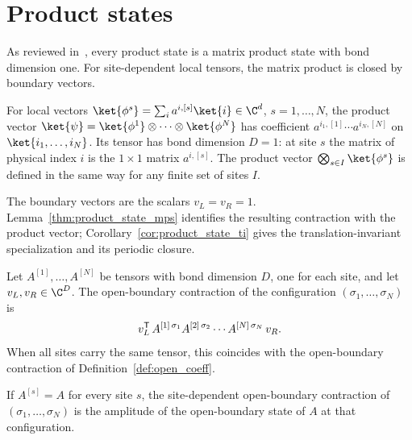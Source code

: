 \section{Product states}\label{sec:product_states}

As reviewed in~\cite[Appendix~A, ``Product states'']{Cirac2021Matrix}, every
product state is a matrix product state with bond dimension one. For
site-dependent local tensors, the matrix product is closed by boundary vectors.

\begin{definition}\label{def:product_state_tensor}
    \leanok
    For local vectors $\ket{\phi^s}=\sum_{i}a^{i,[s]}\ket{i}\in\C^d$,
    $s=1,\ldots,N$, the product vector
    $\ket{\psi}=\ket{\phi^1}\otimes\cdots\otimes\ket{\phi^N}$ has coefficient
    $a^{i_1,[1]}\cdots a^{i_N,[N]}$ on $\ket{i_1,\ldots,i_N}$. Its tensor has
    bond dimension $D=1$: at site $s$ the matrix of physical index $i$ is the
    $1\times1$ matrix $a^{i,[s]}$. The product vector
    $\bigotimes_{s\in I}\ket{\phi^s}$ is defined in the same way for any
    finite set of sites $I$.
\end{definition}

The boundary vectors are the scalars $v_L=v_R=1$.
Lemma~\ref{thm:product_state_mps} identifies the resulting contraction
with the product vector; Corollary~\ref{cor:product_state_ti} gives the
translation-invariant specialization and its periodic closure.

\begin{definition}\label{def:site_open_coeff}
    \leanok
    Let $A^{[1]},\ldots,A^{[N]}$ be tensors with bond dimension $D$, one for
    each site, and let $v_L,v_R\in\C^D$. The open-boundary contraction of the
    configuration $(\sigma_1,\ldots,\sigma_N)$ is
    \begin{align}
        v_L^{\mathsf T}\,A^{[1]\,\sigma_1}A^{[2]\,\sigma_2}\cdots
        A^{[N]\,\sigma_N}\,v_R.
        \notag
    \end{align}
    When all sites carry the same tensor, this coincides with the open-boundary
    contraction of Definition~\ref{def:open_coeff}.
\end{definition}

\begin{lemma}\label{lem:site_open_coeff_const}
    \leanok
    If $A^{[s]}=A$ for every site $s$, the site-dependent open-boundary
    contraction of $(\sigma_1,\ldots,\sigma_N)$ is the amplitude of the
    open-boundary state of $A$ at that configuration.
\end{lemma}

